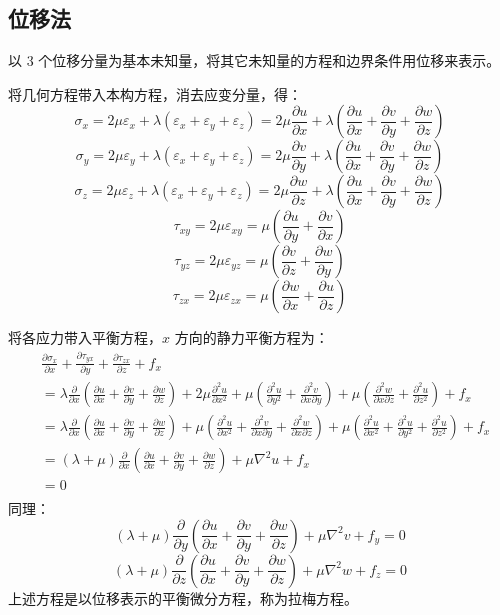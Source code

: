 \documentclass[12pt,a4paper]{article}
\begin{document}
\subsection{位移法}

以 $3$ 个位移分量为基本未知量，将其它未知量的方程和边界条件用位移来表示。

将几何方程带入本构方程，消去应变分量，得：
$$
\sigma_x = 2\mu\varepsilon_x+\lambda(\varepsilon_x+\varepsilon_y+\varepsilon_z) = 2\mu\frac{\partial u}{\partial x}+\lambda(\frac{\partial u}{\partial x}+\frac{\partial v}{\partial y}+\frac{\partial w}{\partial z})
$$
$$
\sigma_y = 2\mu\varepsilon_y+\lambda(\varepsilon_x+\varepsilon_y+\varepsilon_z) = 2\mu\frac{\partial v}{\partial y}+\lambda(\frac{\partial u}{\partial x}+\frac{\partial v}{\partial y}+\frac{\partial w}{\partial z})
$$
$$
\sigma_z = 2\mu\varepsilon_z+\lambda(\varepsilon_x+\varepsilon_y+\varepsilon_z) = 2\mu\frac{\partial w}{\partial z}+\lambda(\frac{\partial u}{\partial x}+\frac{\partial v}{\partial y}+\frac{\partial w}{\partial z}) 
$$
$$
\tau_{xy} = 2\mu\varepsilon_{xy} = \mu(\frac{\partial u}{\partial y}+\frac{\partial v}{\partial x}) 
$$
$$
\tau_{yz} = 2\mu\varepsilon_{yz} = \mu(\frac{\partial v}{\partial z}+\frac{\partial w}{\partial y}) 
$$
$$
\tau_{zx} = 2\mu\varepsilon_{zx} = \mu(\frac{\partial w}{\partial x}+\frac{\partial u}{\partial z}) 
$$

将各应力带入平衡方程，$x$ 方向的静力平衡方程为：
\begin{align*}
& \frac{\partial\sigma_x}{\partial x}+\frac{\partial\tau_{yx}}{\partial y}+\frac{\partial\tau_{zx}}{\partial z}+f_x \\
& = \lambda\frac{\partial}{\partial x}(\frac{\partial u}{\partial x}+\frac{\partial v}{\partial y}+\frac{\partial w}{\partial z})+2\mu\frac{\partial^2 u}{\partial x^2}+\mu(\frac{\partial^2 u}{\partial y^2}+\frac{\partial^2 v}{\partial x\partial y})+\mu(\frac{\partial ^2 w}{\partial x\partial z}+\frac{\partial ^2 u}{\partial z^2})+f_x \\
& = \lambda\frac{\partial}{\partial x}(\frac{\partial u}{\partial x}+\frac{\partial v}{\partial y}+\frac{\partial w}{\partial z})+\mu(\frac{\partial^2 u}{\partial x^2}+\frac{\partial^2 v}{\partial x\partial y}+\frac{\partial^2 w}{\partial x\partial z})+\mu(\frac{\partial^2 u}{\partial x^2}+\frac{\partial^2 u}{\partial y^2}+\frac{\partial^2 u}{\partial z^2})+f_x \\
& = (\lambda + \mu)\frac{\partial}{\partial x}(\frac{\partial u}{\partial x}+\frac{\partial v}{\partial y}+\frac{\partial w}{\partial z})+\mu\nabla ^2 u+f_x \\
& = 0 \\
\end{align*}
同理：
$$
(\lambda + \mu)\frac{\partial}{\partial y}(\frac{\partial u}{\partial x}+\frac{\partial v}{\partial y}+\frac{\partial w}{\partial z})+\mu\nabla ^2 v+f_y=0
$$
$$
(\lambda + \mu)\frac{\partial}{\partial z}(\frac{\partial u}{\partial x}+\frac{\partial v}{\partial y}+\frac{\partial w}{\partial z})+\mu\nabla ^2 w+f_z=0
$$
上述方程是以位移表示的平衡微分方程，称为拉梅方程。
\end{document}
